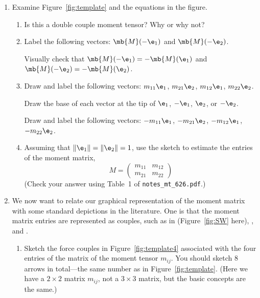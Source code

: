 \documentclass[11pt,titlepage,fleqn]{article}
\newcommand{\mtfile}{\texttt{notes\_mt\_626.pdf}}
\begin{document}
\begin{enumerate}
\item Examine Figure~\ref{fig:template} and the equations in the figure.

\begin{enumerate}
\item Is this a double couple moment tensor? Why or why not?

\item Label the following vectors: $\mb{M}(-\e_1)$ and $\mb{M}(-\e_2)$.

Visually check that $\mb{M}(-\e_1) = -\mb{M}(\e_1)$ and $\mb{M}(-\e_2) = -\mb{M}(\e_2)$.

\item Draw and label the following vectors: $m_{11}\e_1$, $m_{21}\e_2$, $m_{12}\e_1$, $m_{22}\e_2$.

Draw the base of each vector at the tip of $\e_1$, $-\e_1$, $\e_2$, or $-\e_2$.

Draw and label the following vectors: $-m_{11}\e_1$, $-m_{21}\e_2$, $-m_{12}\e_1$, $-m_{22}\e_2$.

\item Assuming that $\|\e_1\| = \|\e_2\| = 1$, use the sketch to estimate the entries of the moment matrix,
%
\begin{equation*}
M = \begin{pmatrix} m_{11} & m_{12} \\ m_{21} & m_{22} \end{pmatrix}
\end{equation*}
%
(Check your answer using Table~1 of \mtfile.)

\end{enumerate}

\item We now want to relate our graphical representation of the moment matrix with some standard depictions in the literature. One is that the moment matrix entries are represented as couples, such as in \citet[][Figure 4.4-4]{SteinWysession} (Figure~\ref{fig:SW} here), \citet[][Figure~9.2]{ShearerE2}, and \citet[][Figure 3.7]{AkiRichardsE2}.
%
\begin{enumerate}
\item Sketch the force couples in Figure~\ref{fig:template4} associated with the four entries of the matrix of the moment tensor $m_{ij}$. You should sketch 8 arrows in total---the same number as in Figure~\ref{fig:template}.
(Here we have a $2 \times 2$ matrix $m_{ij}$, not a $3 \times 3$ matrix, but the basic concepts are the same.)


\end{enumerate}
\end{enumerate}
\end{document}
